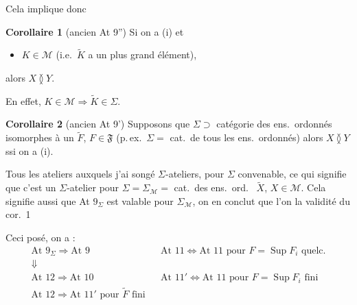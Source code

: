 \documentclass[11pt,a4paper]{article}
\begin{document}
Cela implique donc

\textbf{Corollaire 1} (ancien At 9'') Si on a (i) et
\begin{itemize}
  \item[(ii')] $K \in \mathcal{M}$ (i.e.\ $\widetilde{K}$ a un plus grand élément),
\end{itemize}
alors $X \between Y$.

En effet, $K \in \mathcal{M} \Rightarrow \widetilde{K} \in \Sigma$.

\textbf{Corollaire 2} (ancien At 9') Supposons que $\Sigma \supset$ catégorie des ens.\ ordonnés isomorphes à un $\widetilde{F}$, $F \in \mathfrak{F}$ (p.\,ex.\ $\Sigma =$ cat.\ de tous les ens.\ ordonnés) alors $X \between Y$ ssi on a (i).

Tous les ateliers auxquels j'ai songé   $\Sigma$-ateliers, pour $\Sigma$ convenable, \struck{\ill{}} ce qui signifie que c'est un $\Sigma$-atelier pour $\Sigma = \Sigma_{\mathcal{M}} =$ cat.\ des ens.\ ord.\ \ill{} $\widetilde{X}$, $X \in \mathcal{M}$.
Cela signifie aussi que At $9_{\Sigma}$ est valable pour $\Sigma_{\mathcal{M}}$, on en conclut que l'on \ill{} \ill{} la validité du cor.\ 1


Ceci posé, on a :
\[
  \begin{array}{lll}
    \text{At } 9_{\Sigma} \Longrightarrow \text{At } 9 & & \text{At } 11 \Longleftrightarrow \text{At } 11 \text{ pour } F = \operatorname{Sup} F_i \text{ quelc.} \\
    \Downarrow & & \\
    \text{At } 12 \Longrightarrow \text{At } 10 & & \text{At } 11' \Longleftrightarrow \text{At } 11 \text{ pour } F = \operatorname{Sup} F_i \text{ fini} \\
    \text{At } 12 \Longrightarrow \text{At } 11' \text{ pour } \widetilde{F} \text{ fini} & &
  \end{array}
\]
\end{document}
